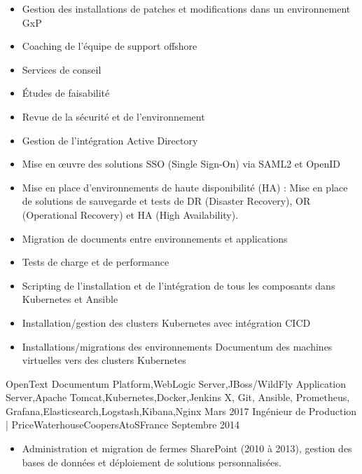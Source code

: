 \begin{experiences}
{\begin{itemize}
                        \item Gestion des installations de patches et modifications dans un environnement GxP                
                        \item Coaching de l’équipe de support offshore
                        \item Services de conseil           
                        \item Études de faisabilité
                        \item Revue de la sécurité et de l'environnement
                        \item Gestion de l'intégration Active Directory
                        \item Mise en œuvre des solutions SSO (Single Sign-On) via SAML2 et OpenID
                        \item Mise en place d'environnements de haute disponibilité (HA) : Mise en place de solutions de sauvegarde et tests de DR (Disaster Recovery), OR (Operational Recovery) et HA (High Availability).
                        \item Migration de documents entre environnements et applications
                        \item Tests de charge et de performance
                        \item Scripting de l'installation et de l'intégration de tous les composants dans Kubernetes et Ansible
                        \item Installation/gestion des clusters Kubernetes avec intégration CICD      
                        \item Installations/migrations des environnements Documentum des machines virtuelles vers des clusters Kubernetes                                             
                      \end{itemize}
                    }
                    {OpenText Documentum Platform,WebLogic Server,JBoss/WildFly Application Server,Apache Tomcat,Kubernetes,Docker,Jenkins X, Git, Ansible, Prometheus, Grafana,Elasticsearch,Logstash,Kibana,Nginx}
  \emptySeparator
  \experience
    {Mars 2017}     {Ingénieur de Production | PriceWaterhouseCoopers}{AtoS}{France}
    {Septembre 2014}    {
                      \begin{itemize}
                        \item Administration et migration de fermes SharePoint (2010 à 2013), gestion des bases de données et déploiement de solutions personnalisées.

\end{itemize}}
\end{experiences}
